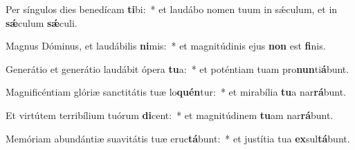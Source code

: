 \item Per síngulos dies benedícam \textbf{ti}bi:~* et laudábo nomen tuum in sǽculum, et in \textbf{sǽ}culum \textbf{sǽ}culi.
\item Magnus Dóminus, et laudábilis \textbf{ni}mis:~* et magnitúdinis ejus \textbf{non} est \textbf{fi}nis.
\item Generátio et generátio laudábit ópera \textbf{tu}a:~* et poténtiam tuam pro\textbf{nun}ti\textbf{á}bunt.
\item Magnificéntiam glóriæ sanctitátis tuæ lo\textbf{quén}tur:~* et mirabília \textbf{tu}a nar\textbf{rá}bunt.
\item Et virtútem terribílium tuórum \textbf{di}cent:~* et magnitúdinem \textbf{tu}am nar\textbf{rá}bunt.
\item Memóriam abundántiæ suavitátis tuæ eruc\textbf{tá}bunt:~* et justítia tua \textbf{ex}sul\textbf{tá}bunt.
